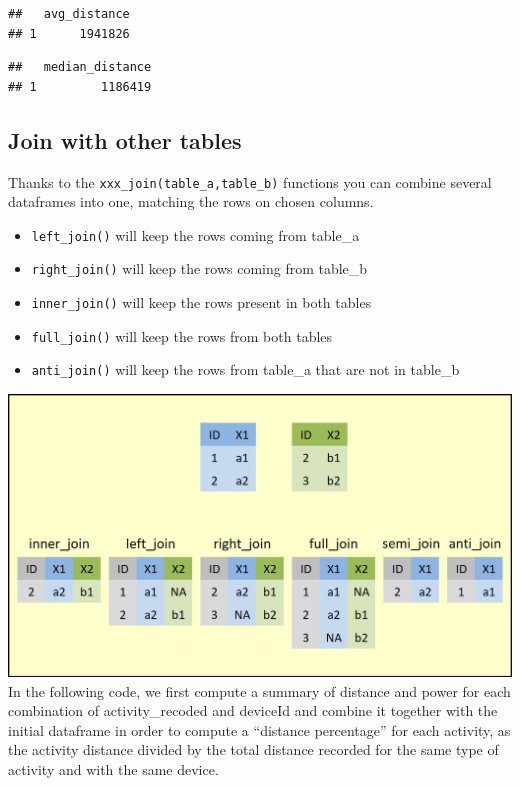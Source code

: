\documentclass[
]{book}
\newenvironment{Shaded}{\begin{snugshade}}{\end{snugshade}}
\newcommand{\DataTypeTok}[1]{\textcolor[rgb]{0.13,0.29,0.53}{#1}}
\newcommand{\KeywordTok}[1]{\textcolor[rgb]{0.13,0.29,0.53}{\textbf{#1}}}
\newcommand{\NormalTok}[1]{#1}
\newcommand{\OperatorTok}[1]{\textcolor[rgb]{0.81,0.36,0.00}{\textbf{#1}}}
\newcommand{\StringTok}[1]{\textcolor[rgb]{0.31,0.60,0.02}{#1}}
\providecommand{\tightlist}{%
  \setlength{\itemsep}{0pt}\setlength{\parskip}{0pt}}
\begin{document}
\begin{verbatim}
##   avg_distance
## 1      1941826
\end{verbatim}

\begin{Shaded}
\end{Shaded}

\begin{verbatim}
##   median_distance
## 1         1186419
\end{verbatim}

\hypertarget{join-with-other-tables}{%
\subsection{Join with other tables}\label{join-with-other-tables}}

Thanks to the \texttt{xxx\_join(table\_a,table\_b)} functions you can combine several dataframes into one, matching the rows on chosen columns.

\begin{itemize}
\tightlist
\item
  \texttt{left\_join()} will keep the rows coming from table\_a
\item
  \texttt{right\_join()} will keep the rows coming from table\_b
\item
  \texttt{inner\_join()} will keep the rows present in both tables
\item
  \texttt{full\_join()} will keep the rows from both tables
\item
  \texttt{anti\_join()} will keep the rows from table\_a that are not in table\_b
\end{itemize}

\includegraphics{img/dplyr-joins.png}
In the following code, we first compute a summary of distance and power for each combination of activity\_recoded and deviceId and combine it together with the initial dataframe in order to compute a ``distance percentage'' for each activity, as the activity distance divided by the total distance recorded for the same type of activity and with the same device.
\end{document}
